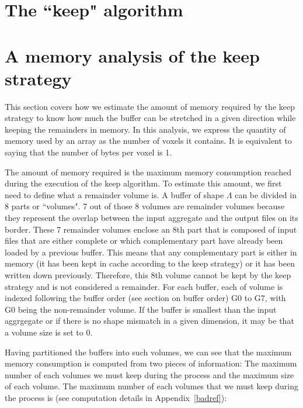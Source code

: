 \documentclass[conference]{IEEEtran}
\begin{document}
\section{The ``keep" algorithm}

\section{A memory analysis of the keep strategy}
This section covers how we estimate the amount of memory required by the keep
strategy to know how much the buffer can be stretched in a given direction while
keeping the remainders in memory. In this analysis, we express the quantity of
memory used by an array as the number of voxels it contains. It is equivalent
to saying that the number of bytes per voxel is 1.

The amount of memory required is the maximum memory consumption reached during
the execution of the keep algorithm. To estimate this amount, we first need to
define what a remainder volume is. A buffer of shape $\Lambda$ can be divided in
8 parts or ``volumes". 7 out of those 8 volumes are remainder volumes because
they represent the overlap between the input aggregate and the output files on
its border. These 7 remainder volumes enclose an 8th part that is composed of
input files that are either complete or which complementary part have already
been loaded by a previous buffer. This means that any complementary part is either
in memory (it has been kept in cache according to the keep strategy) or it has
been written down previously. Therefore, this 8th volume cannot be kept by the
keep strategy and is not considered a remainder. For each buffer, each of volume
is indexed following the buffer order (see section on buffer order) G0 to G7, with
G0 being the non-remainder volume. If the buffer is smallest than the input
aggrgegate or if there is no shape mismatch in a given dimension, it may be that
a volume size is set to 0.

Having partitioned the buffers into such volumes, we can see that the maximum
memory consumption is computed from two pieces of information: The maximum number
of each volumes we must keep during the process and the maximum size of each
volume. The maximum number of each volumes that we must keep during the process
is (see computation details in Appendix~\ref{badref}):
\end{document}
